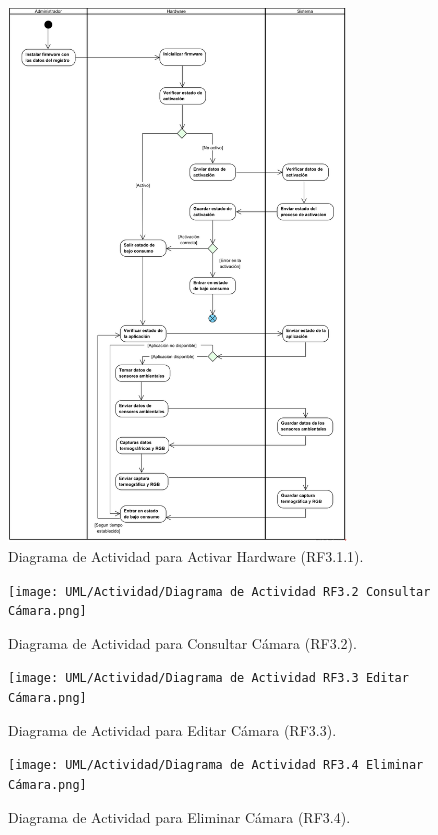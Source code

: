 \begin{figure}[H]
	\centering
		\caption{Diagrama de Actividad para Activar Hardware (RF3.1.1).}
	\includegraphics[width=0.8\textwidth]{UML/Actividad/Diagrama de Actividad RF3.1.1 Activar Hardware.png}
\end{figure}


\begin{figure}[H]
	\centering
	\caption{Diagrama de Actividad para Consultar Cámara (RF3.2).}
 \texttt{[image: UML/Actividad/Diagrama de Actividad RF3.2 Consultar Cámara.png]}
\end{figure}


\begin{figure}[H]
	\centering
	\caption{Diagrama de Actividad para Editar Cámara (RF3.3).}
 \texttt{[image: UML/Actividad/Diagrama de Actividad RF3.3 Editar Cámara.png]}
\end{figure}


\begin{figure}[H]
	\centering
		\caption{Diagrama de Actividad para Eliminar Cámara (RF3.4).}
\texttt{[image: UML/Actividad/Diagrama de Actividad RF3.4 Eliminar Cámara.png]}
\end{figure}


